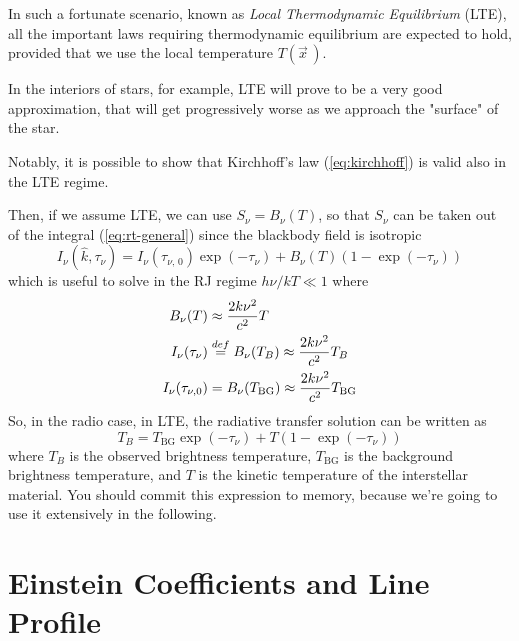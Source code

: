 \par In such a fortunate scenario, known as \emph{Local Thermodynamic Equilibrium} (LTE), all the important laws requiring thermodynamic equilibrium are expected to hold, provided that we use the local temperature $T(\vec{x}\,)$.
\par In the interiors of stars, for example, LTE will prove to be a very good approximation, that will get progressively worse as we approach the "surface" of the star.
\par Notably, it is possible to show that Kirchhoff's law (\ref{eq:kirchhoff}) is valid also in the LTE regime.
\par Then, if we assume LTE, we can use $S_{\nu} = B_{\nu}(T)$, so that $S_{\nu}$ can be taken out of the integral (\ref{eq:rt-general}) since the blackbody field is isotropic
\begin{equation}
    I_{\nu}(\hat{k}, \tau_{\nu}) = I_{\nu}(\tau_{\nu,\,0})\exp(-\tau_{\nu})+B_{\nu}(T)\left(1-\exp(-\tau_{\nu})\right)
\end{equation}
which is useful to solve in the RJ regime $h\nu/kT \ll 1$ where
\begin{align*}
    B_{\nu}(T) &\approx \frac{2k\nu^{2}}{c^{2}}T\\
    I_{\nu}(\tau_{\nu}) &\textoversymbol{=}{def} B_{\nu}(T_{B}) \approx \frac{2k\nu^{2}}{c^{2}}T_{B}\\
    I_{\nu}(\tau_{\nu,0}) &= B_{\nu}(T_{\text{BG}}) \approx \frac{2k\nu^{2}}{c^{2}}T_{\text{BG}}
\end{align*}
So, in the radio case, in LTE, the radiative transfer solution can be written as
\begin{equation}
    \boxed{
        T_{B} = T_{\text{BG}}\exp(-\tau_{\nu}) + T\left(1-\exp(-\tau_{\nu})\right)
    }
    \label{eq:RJ-temperatureeq}
\end{equation}
where $T_{B}$ is the observed brightness temperature, $T_{\text{BG}}$ is the background brightness temperature, and $T$ is the kinetic temperature of the interstellar material. You should commit this expression to memory, because we're going to use it extensively in the following.

\section{Einstein Coefficients and Line Profile}

